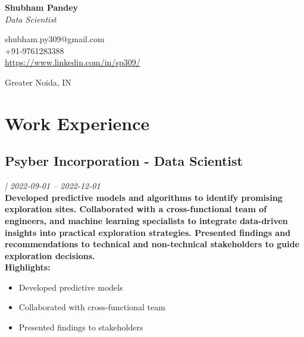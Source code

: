 \documentclass{article}
\begin{document}
\begin{center}
\textbf{\Huge{Shubham Pandey}}\\
\textit{Data Scientist}\\[5pt]
\begin{minipage}[t]{0.5\textwidth}
\begin{flushleft}
\faEnvelope\hspace{2pt}shubham.py309@gmail.com\\
\faPhone\hspace{2pt}+91-9761283388\\
\href{https://www.linkedin.com/in/sp309/}{https://www.linkedin.com/in/sp309/}
\end{flushleft}
\end{minipage}
\begin{minipage}[t]{0.5\textwidth}
\begin{flushright}
Greater Noida, IN\\
\end{flushright}
\end{minipage}
\end{center}

\section{Work Experience}
\subsection{Psyber Incorporation - Data Scientist}
\textit{ | 2022-09-01 -- 2022-12-01}\\
\textbf{Developed predictive models and algorithms to identify promising exploration sites. Collaborated with a cross-functional team of engineers, and machine learning specialists to integrate data-driven insights into practical exploration strategies. Presented findings and recommendations to technical and non-technical stakeholders to guide exploration decisions.}\\
\textbf{Highlights:}
\begin{itemize}
\item Developed predictive models
\item Collaborated with cross-functional team
\item Presented findings to stakeholders
\end{itemize}
\end{document}

